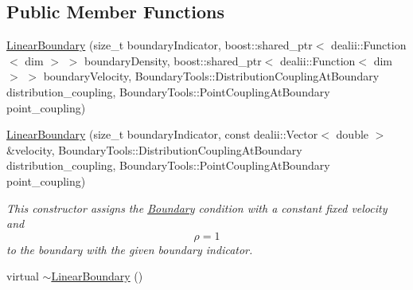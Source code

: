 \subsection*{Public Member Functions}
\begin{DoxyCompactItemize}
\item 
\hyperlink{classnatrium_1_1LinearBoundary_a58366f152d702561d9d30584e2c6970b}{LinearBoundary} (size\_\-t boundaryIndicator, boost::shared\_\-ptr$<$ dealii::Function$<$ dim $>$ $>$ boundaryDensity, boost::shared\_\-ptr$<$ dealii::Function$<$ dim $>$ $>$ boundaryVelocity, BoundaryTools::DistributionCouplingAtBoundary distribution\_\-coupling, BoundaryTools::PointCouplingAtBoundary point\_\-coupling)
\item 
\hyperlink{classnatrium_1_1LinearBoundary_a7f0b83d5c09a113a1c9ad025704962f9}{LinearBoundary} (size\_\-t boundaryIndicator, const dealii::Vector$<$ double $>$ \&velocity, BoundaryTools::DistributionCouplingAtBoundary distribution\_\-coupling, BoundaryTools::PointCouplingAtBoundary point\_\-coupling)
\begin{DoxyCompactList}\small\item\em This constructor assigns the \hyperlink{classnatrium_1_1Boundary}{Boundary} condition with a constant fixed velocity and \[ \rho = 1 \] to the boundary with the given boundary indicator. \item\end{DoxyCompactList}\item 
\hypertarget{classnatrium_1_1LinearBoundary_a5ce674b82ca4dc5bec9e03b40e55b095}{
virtual \hyperlink{classnatrium_1_1LinearBoundary_a5ce674b82ca4dc5bec9e03b40e55b095}{$\sim$LinearBoundary} ()}
\label{classnatrium_1_1LinearBoundary_a5ce674b82ca4dc5bec9e03b40e55b095}


\end{DoxyCompactItemize}
